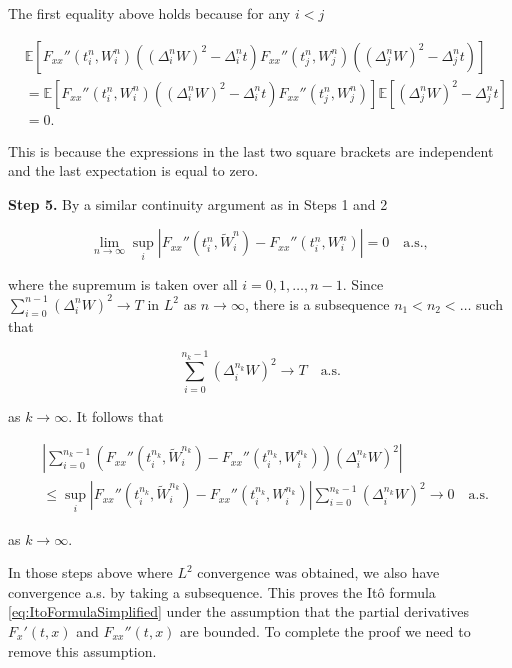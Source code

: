 \begin{Proof}
The first equality above holds because for any $i < j$

\begin{align}
& \mathbb{E}\left[F_{xx}''(t_i^n, W_i^n) \left((\Delta_i^n W)^2 - \Delta_i^n t\right) F_{xx}''(t_j^n, W_j^n) \left((\Delta_j^n W)^2 - \Delta_j^n t\right)\right] \\
& = \mathbb{E}\left[F_{xx}''(t_i^n, W_i^n) \left((\Delta_i^n W)^2 - \Delta_i^n t\right) F_{xx}''(t_j^n, W_j^n)\right] \mathbb{E}\left[(\Delta_j^n W)^2 - \Delta_j^n t\right] \\
& = 0.
\end{align}

This is because the expressions in the last two square brackets are independent and the last expectation is equal to zero.

\medskip\noindent\textbf{Step 5.} By a similar continuity argument as in Steps 1 and 2

\begin{equation}
\lim_{n \to \infty} \sup_i \left|F_{xx}''(t_i^n, \tilde{W}_i^n) - F_{xx}''(t_i^n, W_i^n)\right| = 0 \quad \text{a.s.},
\end{equation}

where the supremum is taken over all $i = 0, 1, \ldots, n-1$. Since $\sum_{i=0}^{n-1} (\Delta_i^n W)^2 \to T$ in $L^2$ as $n \to \infty$, there is a subsequence $n_1 < n_2 < \ldots$ such that

\begin{equation}
\sum_{i=0}^{n_k-1} \left(\Delta_i^{n_k} W\right)^2 \to T \quad \text{a.s.}
\end{equation}

as $k \to \infty$. It follows that

\begin{align}
& \left|\sum_{i=0}^{n_k-1} \left(F_{xx}''(t_i^{n_k}, \tilde{W}_i^{n_k}) - F_{xx}''(t_i^{n_k}, W_i^{n_k})\right) \left(\Delta_i^{n_k} W\right)^2\right| \label{eq:Step5_ineq} \\
& \leq \sup_i \left|F_{xx}''(t_i^{n_k}, \tilde{W}_i^{n_k}) - F_{xx}''(t_i^{n_k}, W_i^{n_k})\right| \sum_{i=0}^{n_k-1} \left(\Delta_i^{n_k} W\right)^2 \to 0 \quad \text{a.s.} \label{eq:Step5_limit}
\end{align}

as $k \to \infty$.

In those steps above where $L^2$ convergence was obtained, we also have convergence a.s. by taking a subsequence. This proves the Itô formula \eqref{eq:ItoFormulaSimplified} under the assumption that the partial derivatives $F_x'(t, x)$ and $F_{xx}''(t, x)$ are bounded. To complete the proof we need to remove this assumption.


\end{Proof}
